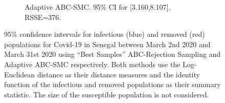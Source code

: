 \documentclass[11pt,a4paper]{article}
\theoremstyle{break}
\begin{document}
\begin{figure}[H]
{\begin{subfigure}{.45\paperwidth}
        \caption{Adaptive ABC-SMC. 95\% CI for [3.160,8.107]. RSSE=376.}
        \label{fig_senegal_identity_ci_adapt_abc_smc}
      \end{subfigure}
    }
    \caption{95\% confidence intervals for infectious (blue) and removed (red) populations for Covid-19 in Senegal between March 2nd 2020 and March 31st 2020 using ``Best Samples'' ABC-Rejection Sampling and Adaptive ABC-SMC respectively. Both methods use the Log-Euclidean distance as their distance measures and the identity function of the infectious and removed populations as their summary statistic. The size of the susceptible population is not considered.}
    \label{fig_senegal_identity_ci}
  \end{figure}

  \begin{figure}[H]
    \centering
\end{figure}
\end{document}
